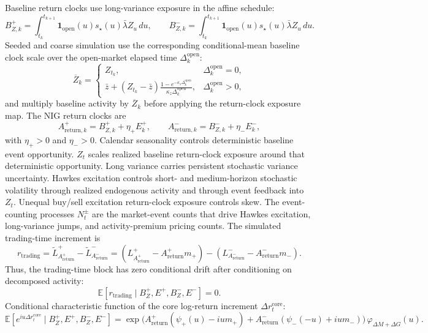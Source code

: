 \documentclass[11pt]{article}
\begin{document}
    Baseline return clocks use long-variance exposure in the affine schedule:
    \[
        B_{Z,k}^+
        =
        \int_{t_k}^{t_{k+1}}\mathbf{1}_{\mathrm{open}}(u)s_\star(u)\bar{\lambda}Z_u\,du,
        \qquad
        B_{Z,k}^-
        =
        \int_{t_k}^{t_{k+1}}\mathbf{1}_{\mathrm{open}}(u)s_\star(u)\bar{\lambda}Z_u\,du.
    \]
    Seeded and coarse simulation use the corresponding conditional-mean
    baseline clock scale over the open-market elapsed time \(\Delta_k^{\mathrm{open}}\):
    \[
        \overline{Z}_k
        =
        \begin{cases}
            Z_{t_k}, & \Delta_k^{\mathrm{open}}=0,\\[4pt]
            \displaystyle
            \bar z+
            (Z_{t_k}-\bar z)
            \frac{1-e^{-\kappa_z\Delta_k^{\mathrm{open}}}}
                 {\kappa_z\Delta_k^{\mathrm{open}}},
            & \Delta_k^{\mathrm{open}}>0,
        \end{cases}
    \]
    and multiply baseline activity by \(\overline{Z}_k\) before applying the
    return-clock exposure map.
    The NIG return clocks are
    \[
        A_{\mathrm{return},k}^+
        =
        B_{Z,k}^+ + \eta_+E_k^+,
        \qquad
        A_{\mathrm{return},k}^-
        =
        B_{Z,k}^- + \eta_-E_k^-,
    \]
    with \(\eta_+>0\) and \(\eta_->0\).
    Calendar seasonality controls deterministic baseline event opportunity.
    \(Z_t\) scales realized baseline return-clock exposure around that deterministic opportunity.
    Long variance carries persistent stochastic variance uncertainty.
    Hawkes excitation controls short- and medium-horizon stochastic volatility through
    realized endogenous activity and through event feedback into \(Z_t\).
    Unequal buy/sell excitation return-clock exposure controls skew.
    The event-counting processes \(N_t^\pm\) are the market-event counts that
    drive Hawkes excitation, long-variance jumps, and activity-premium pricing counts.
    The simulated trading-time increment is
    \[
        r_{\mathrm{trading}}
        =
        \widetilde L^+_{A_{\mathrm{return}}^+}
        -
        \widetilde L^-_{A_{\mathrm{return}}^-}
        =
        (L^+_{A_{\mathrm{return}}^+}-A_{\mathrm{return}}^+m_+)
        -
        (L^-_{A_{\mathrm{return}}^-}-A_{\mathrm{return}}^-m_-).
    \]
    Thus, the trading-time block has zero conditional drift after conditioning on
    decomposed activity:
    \[
        \mathbb{E}\!\left[
            r_{\mathrm{trading}}
            \mid B_Z^+,E^+,B_Z^-,E^-
        \right]=0.
    \]
    Conditional characteristic function of the core log-return increment
    \(\Delta r_t^{\mathrm{core}}\):
    \[
        \mathbb{E}\!\left[
            e^{iu\Delta r_t^{\mathrm{core}}}
            \mid B_Z^+,E^+,B_Z^-,E^-
        \right]
        =
        \exp\!\Big(
            A_{\mathrm{return}}^+(\psi_+(u)-ium_+)
            +
            A_{\mathrm{return}}^-(\psi_-(-u)+ium_-)
        \Big)\,\varphi_{\Delta M+\Delta G}(u).
    \]
\end{document}
